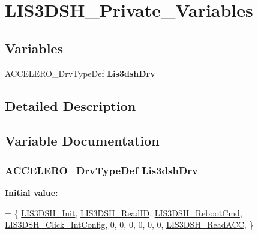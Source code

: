 \hypertarget{group__LIS3DSH__Private__Variables}{\section{L\-I\-S3\-D\-S\-H\-\_\-\-Private\-\_\-\-Variables}
\label{group__LIS3DSH__Private__Variables}
}
\subsection*{Variables}
\begin{DoxyCompactItemize}
\item 
A\-C\-C\-E\-L\-E\-R\-O\-\_\-\-Drv\-Type\-Def {\bfseries Lis3dsh\-Drv}
\end{DoxyCompactItemize}


\subsection{Detailed Description}


\subsection{Variable Documentation}
\hypertarget{group__LIS3DSH__Private__Variables_ga9725b9d7aae272a4e7287db82161818e}{
\subsubsection[{Lis3dsh\-Drv}]{\setlength{\rightskip}{0pt plus 5cm}A\-C\-C\-E\-L\-E\-R\-O\-\_\-\-Drv\-Type\-Def Lis3dsh\-Drv}}\label{group__LIS3DSH__Private__Variables_ga9725b9d7aae272a4e7287db82161818e}
{\bfseries Initial value\-:}
\begin{DoxyCode}
=
\{
  \hyperlink{group__LIS3DSH__Private__Functions_ga39a50faf3ec718fd4782fd951e6db26b}{LIS3DSH\_Init},
  \hyperlink{group__LIS3DSH__Private__Functions_ga47e1a458eddb3143569fe0e995f0513f}{LIS3DSH\_ReadID},
  \hyperlink{group__LIS3DSH__Private__Functions_gaf404d817cf34093ac2cb46dcffcab4ed}{LIS3DSH\_RebootCmd},
  \hyperlink{group__LIS3DSH__Private__Functions_ga0bf34901c622846b07db03299bb9a3a1}{LIS3DSH\_Click\_IntConfig},
  0,
  0,
  0,
  0,
  0,
  0,
  \hyperlink{group__LIS3DSH__Private__Functions_ga8e33fb97929654753950b3799ed9b5f5}{LIS3DSH\_ReadACC},
\}
\end{DoxyCode}
